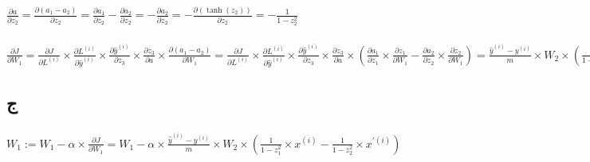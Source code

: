 \documentclass{article}
\begin{document}
\subsubsection{}
\begin{latin}
$ 
\frac{\partial a}{\partial z_2}
= \frac{\partial \left( a_1 - a_2 \right)}{\partial z_2}
= \frac{\partial a_1}{\partial z_2} - \frac{\partial a_2}{\partial z_2}
= - \frac{\partial a_2}{\partial z_2}
= - \frac{\partial \left( \tanh\left( z_2 \right) \right)}{\partial z_2}
= - \frac{1}{1 - z_2 ^ 2}
$
\end{latin}

\subsubsection{}
\begin{latin}
$
  \frac{\partial J}{\partial W_1}
= \frac{\partial J}{\partial L ^ {\left( i \right)}} \times \frac{\partial L ^ {\left( i \right)}}{\partial \hat{y} ^ {\left( i \right)}} \times \frac{\partial \hat{y} ^ {\left( i \right)}}{\partial z_3} \times \frac{\partial z_3}{\partial a} \times \frac{\partial \left( a_1 - a_2 \right)}{\partial W_1}
= \frac{\partial J}{\partial L ^ {\left( i \right)}} \times \frac{\partial L ^ {\left( i \right)}}{\partial \hat{y} ^ {\left( i \right)}} \times \frac{\partial \hat{y} ^ {\left( i \right)}}{\partial z_3} \times \frac{\partial z_3}{\partial a} \times \left( \frac{\partial a_1}{\partial z_1} \times \frac{\partial z_1}{\partial W_1} - \frac{\partial a_2}{\partial z_2} \times \frac{\partial z_2}{\partial W_1} \right)
= \frac{\hat{y} ^ {\left( i \right)} - y ^ {\left( i \right)}}{m} \times W_2 \times \left( \frac{1}{1-z_1 ^ 2} \times x ^ {\left( i \right)} - \frac{1}{1 - z_2 ^ 2} \times x ^ {\prime \left( i \right)} \right)
$
\end{latin}

\subsection{ج}
\subsubsection{}
\begin{latin}
$
W_1 := W_1 - \alpha \times \frac{\partial J}{\partial W_1}
= W_1 - \alpha \times \frac{\hat{y} ^ {\left( i \right)} - y ^ {\left( i \right)}}{m} \times W_2 \times \left( \frac{1}{1-z_1 ^ 2} \times x ^ {\left( i \right)} - \frac{1}{1 - z_2 ^ 2} \times x ^ {\prime \left( i \right)} \right)
$
\end{latin}
\end{document}
